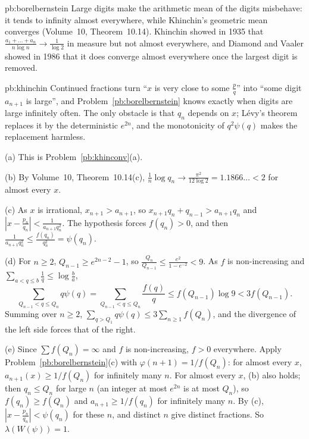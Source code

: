 \begin{solution}{pb:borelbernstein}
\leads Large digits make the arithmetic mean of the digits misbehave: it tends to infinity almost everywhere, while Khinchin's geometric mean converges
(Volume~10, Theorem~10.14). Khinchin showed in 1935 that $\frac{a_1+\dots+a_n}{n\log n}\to\frac1{\log2}$ in measure but not almost everywhere, and Diamond and
Vaaler showed in 1986 that it does converge almost everywhere once the largest digit is removed.
\end{solution}

\begin{solution}{pb:khinchin}
\idea Continued fractions turn ``$x$ is very close to some $\frac pq$'' into ``some digit $a_{n+1}$ is large'', and Problem~\ref{pb:borelbernstein} knows
exactly when digits are large infinitely often. The only obstacle is that $q_n$ depends on $x$; Lévy's theorem replaces it by the deterministic $e^{2n}$, and the
monotonicity of $q^2\psi(q)$ makes the replacement harmless.

\writeup (a) This is Problem~\ref{pb:khinconv}(a).

(b) By Volume~10, Theorem~10.14(c), $\frac1n\log q_n\to\frac{\pi^2}{12\log2}=1.1866\ldots<2$ for almost every $x$.

(c) As $x$ is irrational, $x_{n+1}>a_{n+1}$, so $x_{n+1}q_n+q_{n-1}>a_{n+1}q_n$ and $|x-\frac{p_n}{q_n}|<\frac1{a_{n+1}q_n^2}$. The hypothesis forces $f(q_n)>0$, and then
$\frac1{a_{n+1}q_n^2}\le\frac{f(q_n)}{q_n^2}=\psi(q_n)$.

(d) For $n\ge2$, $Q_{n-1}\ge e^{2n-2}-1$, so $\frac{Q_n}{Q_{n-1}}\le\frac{e^2}{1-e^{-2}}<9$. As $f$ is non-increasing and $\sum_{a<q\le b}\frac1q\le\log\frac ba$,
\[
\sum_{Q_{n-1}<q\le Q_n}q\psi(q)=\sum_{Q_{n-1}<q\le Q_n}\frac{f(q)}q\le f(Q_{n-1})\log9<3f(Q_{n-1}).
\]
Summing over $n\ge2$, $\sum_{q>Q_1}q\psi(q)\le3\sum_{n\ge1}f(Q_n)$, and the divergence of the left side forces that of the right.

(e) Since $\sum f(Q_n)=\infty$ and $f$ is non-increasing, $f>0$ everywhere. Apply Problem~\ref{pb:borelbernstein}(c) with $\varphi(n+1)=1/f(Q_n)$: for almost every
$x$, $a_{n+1}(x)\ge1/f(Q_n)$ for infinitely many $n$. For almost every $x$, (b) also holds; then $q_n\le Q_n$ for large $n$ (an integer at most $e^{2n}$ is at most
$Q_n$), so $f(q_n)\ge f(Q_n)$ and $a_{n+1}\ge1/f(q_n)$ for infinitely many $n$. By (c), $|x-\frac{p_n}{q_n}|<\psi(q_n)$ for these $n$, and distinct $n$ give distinct
fractions. So $\lambda(W(\psi))=1$.


\end{solution}
